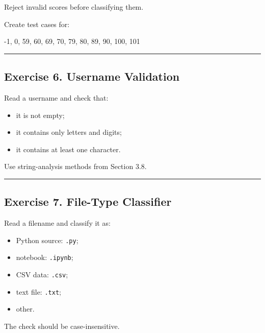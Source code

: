 \documentclass[
  11pt,
  a4paper,
]{article}
\newenvironment{Shaded}{}{}
\newcommand{\NormalTok}[1]{#1}
\providecommand{\tightlist}{%
  \setlength{\itemsep}{0pt}\setlength{\parskip}{0pt}}
\begin{document}
Reject invalid scores before classifying them.

Create test cases for:

\begin{Shaded}
\begin{Highlighting}[]
\NormalTok{{-}1, 0, 59, 60, 69, 70, 79, 80, 89, 90, 100, 101}
\end{Highlighting}
\end{Shaded}

\begin{center}\rule{0.5\linewidth}{0.5pt}\end{center}

\subsection{Exercise 6. Username
Validation}\label{exercise-6.-username-validation}

Read a username and check that:

\begin{itemize}
\tightlist
\item
  it is not empty;
\item
  it contains only letters and digits;
\item
  it contains at least one character.
\end{itemize}

Use string-analysis methods from Section 3.8.

\begin{center}\rule{0.5\linewidth}{0.5pt}\end{center}

\subsection{Exercise 7. File-Type
Classifier}\label{exercise-7.-file-type-classifier}

Read a filename and classify it as:

\begin{itemize}
\tightlist
\item
  Python source: \texttt{.py};
\item
  notebook: \texttt{.ipynb};
\item
  CSV data: \texttt{.csv};
\item
  text file: \texttt{.txt};
\item
  other.
\end{itemize}

The check should be case-insensitive.
\end{document}
